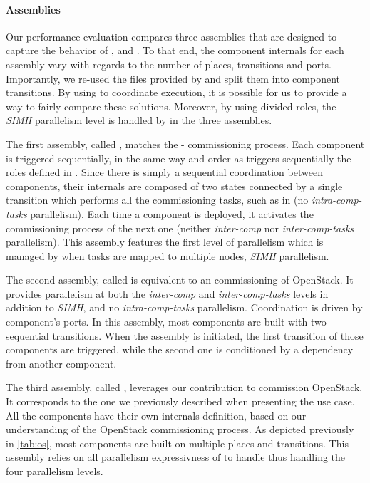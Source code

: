 \paragraph{Assemblies}
Our performance evaluation compares three assemblies that
are designed to capture the behavior of \ansible, \aeolus and \mad. To
that end, the component internals for each assembly vary with regards
to the number of places, transitions and ports. Importantly, we re-used
the \ansible files provided by
\kolla and split them into component transitions. By using \mad to
coordinate \ansible execution, it is possible for us to provide a way
to fairly compare these solutions. Moreover, by using divided \kolla
roles, the \emph{SIMH} parallelism level is handled by \ansible in the
three assemblies.

The first assembly, called \ansass, matches the \kolla-\ansible
commissioning process. Each component is triggered sequentially, in
the same way and order as \ansible triggers sequentially the roles
defined in \kolla. Since there is simply a sequential coordination
between components, their internals are composed of two states
connected by a single transition which performs all the commissioning
tasks, such as in \kolla (\ie no \emph{intra-comp-tasks}
parallelism). Each time a component is deployed, it activates the
commissioning process of the next one (\ie neither \emph{inter-comp}
nor \emph{inter-comp-tasks} parallelism). This assembly features the
first level of parallelism which is managed by \ansible when tasks are
mapped to multiple nodes, \ie \emph{SIMH} parallelism.
%

The second assembly, called \aeoass is equivalent to an \aeolus
commissioning of OpenStack. It provides parallelism at both the
\emph{inter-comp} and \emph{inter-comp-tasks} levels in addition to
\emph{SIMH}, and no \emph{intra-comp-tasks} parallelism. Coordination
is driven by component's ports. In this assembly, most components are
built with two sequential transitions. When the assembly is
initiated, the first transition of those components are triggered,
while the second one is conditioned by a dependency from another
component.
%

The third assembly, called \madass, leverages our contribution to
commission OpenStack. It corresponds to the one we previously
described when presenting the use case. All the components have their
own internals definition, based on our understanding of the OpenStack
commissioning process. As depicted previously in \cref{tab:os}, most
components are built on multiple places and transitions. This assembly
relies on all parallelism expressivness of \mad to handle thus handling the four 
parallelism levels.

